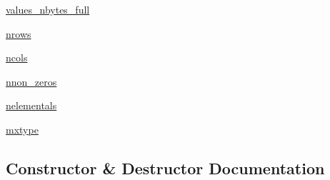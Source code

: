 \begin{DoxyCompactItemize}
\hyperlink{classscipy_1_1io_1_1harwell__boeing_1_1hb_1_1HBInfo_a297f1aa84d065dcf4f402995620d4d18}{values\+\_\+nbytes\+\_\+full}
\item 
\hyperlink{classscipy_1_1io_1_1harwell__boeing_1_1hb_1_1HBInfo_ad13ddf34a057cbdd4ef8d79339bc7129}{nrows}
\item 
\hyperlink{classscipy_1_1io_1_1harwell__boeing_1_1hb_1_1HBInfo_a2a7d180f099d09e5c6942810911f2964}{ncols}
\item 
\hyperlink{classscipy_1_1io_1_1harwell__boeing_1_1hb_1_1HBInfo_ac3c465196ad76a93a8b33a22aaefd143}{nnon\+\_\+zeros}
\item 
\hyperlink{classscipy_1_1io_1_1harwell__boeing_1_1hb_1_1HBInfo_a9b4cacadba7d489126f2334716364f53}{nelementals}
\item 
\hyperlink{classscipy_1_1io_1_1harwell__boeing_1_1hb_1_1HBInfo_a4588ce35bca4baa16a518310dba801f6}{mxtype}
\end{DoxyCompactItemize}


\subsection{Constructor \& Destructor Documentation}
\hypertarget{classscipy_1_1io_1_1harwell__boeing_1_1hb_1_1HBInfo_a08e6ecf6f1871727dd0b874cb8691883}{}
